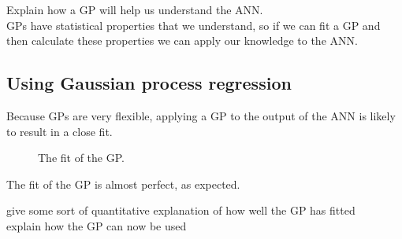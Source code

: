\begin{todo}
	Explain how a GP will help us understand the ANN. \\
	GPs have statistical properties that we understand, so if we can fit a GP and then calculate these properties we can apply our knowledge to the ANN.
\end{todo}

\subsection{Using Gaussian process regression}

Because \acp{GP} are very flexible, applying a \ac{GP} to the output of the \acl{ANN} is likely to result in a close fit.

\begin{figure}[htbp]
	\centering
	
	\caption{The fit of the \ac{GP}.}
	\label{fig:gp-fit}
\end{figure}

The fit of the \ac{GP} is almost perfect, as expected.

\begin{todo}
	give some sort of quantitative explanation of how well the GP has fitted \\
	explain how the GP can now be used
\end{todo}

